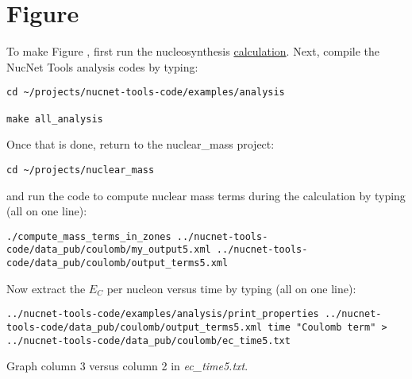 \section*{Figure }
\hypertarget{sec:ec_time5}{}


\noindent To make Figure ,
first run the nucleosynthesis \hyperlink{sec:single_zone}{calculation}.
Next, compile the NucNet Tools analysis codes by typing:
\begin{verbatim}
cd ~/projects/nucnet-tools-code/examples/analysis

make all_analysis
\end{verbatim}
Once that is done, return to the nuclear\_mass project:
\begin{verbatim}
cd ~/projects/nuclear_mass
\end{verbatim}
and run the code to compute nuclear mass terms during the calculation by
typing (all on one line):
\begin{verbatim}
./compute_mass_terms_in_zones ../nucnet-tools-code/data_pub/coulomb/my_output5.xml ../nucnet-tools-code/data_pub/coulomb/output_terms5.xml
\end{verbatim}
Now extract the $E_C$ per nucleon versus time by typing (all on one line):
\begin{verbatim}
../nucnet-tools-code/examples/analysis/print_properties ../nucnet-tools-code/data_pub/coulomb/output_terms5.xml time "Coulomb term" > ../nucnet-tools-code/data_pub/coulomb/ec_time5.txt
\end{verbatim}
Graph column 3 versus column 2 in {\em ec\_time5.txt}.

\addtocounter{counter}{1}

